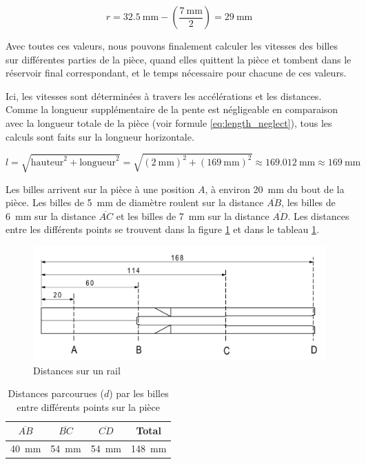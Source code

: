 \[r = \SI{32.5}{\mm} - \left(\frac{\SI{7}{\mm}}{2}\right) = \SI{29}{\mm}\]

Avec toutes ces valeurs, nous pouvons finalement calculer les vitesses des billes sur différentes parties de la pièce, quand elles quittent la pièce et tombent dans le réservoir final correspondant, et le temps nécessaire pour chacune de ces valeurs.

Ici, les vitesses sont déterminées à travers les accélérations et les distances. Comme la longueur supplémentaire de la pente est négligeable en comparaison avec la longueur totale de la pièce (voir formule \ref{eq:length_neglect}), tous les calculs sont faits sur la longueur horizontale.

\begin{equation}
    l = \sqrt{\text{hauteur}^2 + \text{longueur}^2} = \sqrt{(\SI{2}{\mm})^2 + (\SI{169}{\mm})^2} \approx \SI{169.012}{\mm} \approx \SI{169}{\mm}
    \label{eq:length_neglect}
\end{equation}

Les billes arrivent sur la pièce à une position $A$, à environ \SI{20}{\mm} du bout de la pièce. Les billes de \SI{5}{\mm} de diamètre roulent sur la distance $\overline{AB}$, les billes de \SI{6}{\mm} sur la distance $\overline{AC}$ et les billes de \SI{7}{\mm} sur la distance $\overline{AD}$. Les distances entre les différents points se trouvent dans la figure \ref{fig:distances_rails} et dans le tableau \ref{tab:sphere_rolling_distance}.

\begin{figure}
    \centering
    \includegraphics[width=\textwidth]{Graphics/Rails/DISTANCES.pdf}
    \caption{Distances sur un rail}
    \label{fig:distances_rails}
\end{figure}

\begin{table}[htbp]
    \centering
    \begin{tabular}{|c|c|c|c|}
        \hline
        $\overline{AB}$ & $\overline{BC}$ & $\overline{CD}$ & Total \\
        \hline
        \SI{40}{\mm} & \SI{54}{\mm} & \SI{54}{\mm} & \SI{148}{\mm} \\
        \hline
    \end{tabular}
    \caption{Distances parcourues ($d$) par les billes entre différents points sur la pièce}
    \label{tab:sphere_rolling_distance}
\end{table}

